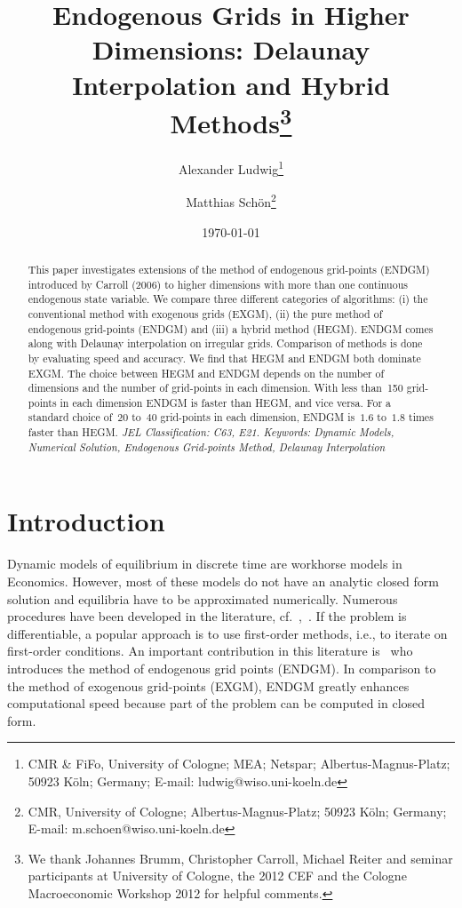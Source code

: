 \documentclass[a4paper,12pt]{article}
\begin{document}
\title{Endogenous Grids in Higher Dimensions: Delaunay Interpolation and Hybrid Methods\thanks{We thank Johannes Brumm, Christopher Carroll, Michael Reiter and seminar participants at University of Cologne, the 2012 CEF and the Cologne Macroeconomic Workshop 2012 for helpful comments.}}
\author{Alexander Ludwig\thanks{CMR \& FiFo, University of Cologne; MEA; Netspar; Albertus-Magnus-Platz; 50923 K\"oln; Germany; E-mail: ludwig@wiso.uni-koeln.de}
\and Matthias Sch\"{o}n\thanks{CMR, University of Cologne; Albertus-Magnus-Platz; 50923 K\"{o}ln; Germany; E-mail: m.schoen@wiso.uni-koeln.de}}
\date{\today}
\maketitle

\begin{abstract}
This paper investigates extensions of the method of endogenous grid-points (ENDGM) introduced by Carroll (2006) to higher dimensions with more than one continuous endogenous state variable. We compare three different categories of algorithms: (i) the conventional method with exogenous grids (EXGM), (ii) the pure method of endogenous grid-points (ENDGM) and (iii) a hybrid method (HEGM). ENDGM comes along with Delaunay interpolation on irregular grids. Comparison of methods is done by evaluating speed and accuracy. We find that HEGM and ENDGM both dominate EXGM. The choice between HEGM and ENDGM depends on the number of dimensions and the number of grid-points in each dimension. With less than~150 grid-points in each dimension ENDGM is faster than HEGM, and vice versa. For a standard choice of~$20$ to~$40$ grid-points in each dimension, ENDGM is~$1.6$ to~$1.8$ times faster than HEGM. 
\newline\textit{JEL Classification: C63, E21.
\newline Keywords: Dynamic Models, Numerical Solution, Endogenous Grid-points Method, Delaunay Interpolation}

\end{abstract}

\newpage
{} 
\renewcommand{\thefootnote}{\arabic{footnote}} 
\setcounter{footnote}{0}

\section{Introduction}

Dynamic models of equilibrium in discrete time are workhorse models in Economics. However, most of these models do not have an analytic closed form solution and equilibria have to be approximated numerically. Numerous procedures have been developed in the literature, cf.~,~. If the problem is differentiable, a popular approach is to use first-order methods, i.e., to iterate on first-order conditions. An important contribution in this literature is~ who introduces the method of endogenous grid points (ENDGM). In comparison to the method of exogenous grid-points (EXGM), ENDGM greatly enhances computational speed because part of the problem can be computed in closed form.
\end{document}
